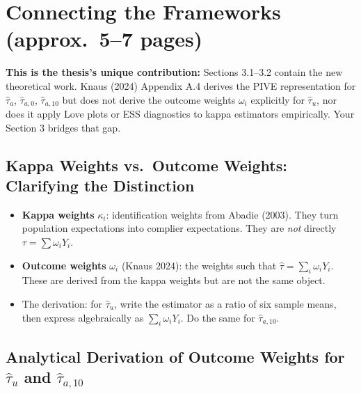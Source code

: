 \documentclass[12pt, a4paper]{article}
\newenvironment{notebox}[1][Note]{%
  \begin{mdframed}[backgroundcolor=boxbg,linecolor=chapterblue,linewidth=1pt]%
  \textbf{\color{chapterblue}#1:} }{%
  \end{mdframed}}
\begin{document}
\section{Connecting the Frameworks \textnormal{\small(approx.\ 5--7 pages)}}

\begin{notebox}[This is the thesis's unique contribution]
Sections 3.1--3.2 contain the new theoretical work. Knaus (2024) Appendix A.4 derives the PIVE representation for $\hat\tau_a$, $\hat\tau_{a,0}$, $\hat\tau_{a,10}$ but does not derive the outcome weights $\omega_i$ explicitly for $\hat\tau_u$, nor does it apply Love plots or ESS diagnostics to kappa estimators empirically. Your Section 3 bridges that gap.
\end{notebox}

\subsection{Kappa Weights vs.\ Outcome Weights: Clarifying the Distinction}

\begin{itemize}
  \item \textbf{Kappa weights} $\kappa_i$: identification weights from Abadie (2003). They turn population expectations into complier expectations. They are \emph{not} directly $\tau = \sum \omega_i Y_i$.
  \item \textbf{Outcome weights} $\omega_i$ (Knaus 2024): the weights such that $\hat\tau = \sum_i \omega_i Y_i$. These are derived from the kappa weights but are not the same object.
  \item The derivation: for $\hat\tau_u$, write the estimator as a ratio of six sample means, then express algebraically as $\sum_i \omega_i Y_i$. Do the same for $\hat\tau_{a,10}$.
\end{itemize}

\subsection{Analytical Derivation of Outcome Weights for $\hat\tau_u$ and $\hat\tau_{a,10}$}
\end{document}
